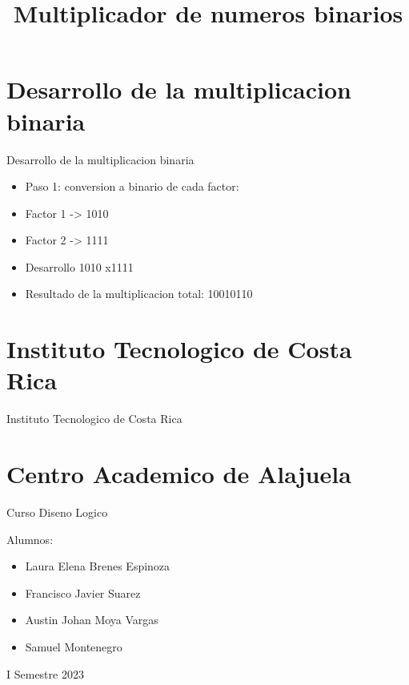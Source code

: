 \documentclass[11pt]{beamer}
\title{Multiplicador de numeros binarios}
\begin{document}
    \begin{frame}
        \maketitle
    \end{frame}
    \section{Desarrollo de la multiplicacion binaria}
    \begin{frame}{Desarrollo de la multiplicacion binaria}
        \begin{itemize}
        \item Paso 1: conversion a binario de cada factor:
        \item    Factor 1 -> 1010
        \item    Factor 2 -> 1111
        \item Desarrollo 
        \newline
      \hphantom{123456789101112}1010
        \newline      \hphantom{12345678910111}x1111
        \item Resultado de la multiplicacion total: 10010110
        \end{itemize}
    \end{frame}
    \section{Instituto Tecnologico de Costa Rica}
    \begin{frame}{Instituto Tecnologico de Costa Rica}    \section{Centro Academico de Alajuela}        Curso Diseno Logico 
        \newline

        Alumnos:
        \begin{itemize}
        \item Laura Elena Brenes Espinoza
        \item Francisco Javier Suarez 
        \item Austin Johan Moya Vargas
        \item Samuel Montenegro
        \end{itemize}

        I Semestre 2023
    \end{frame}
    
\end{document}
